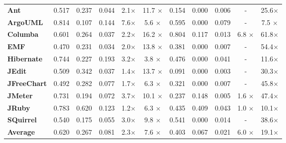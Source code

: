 \begin{table}[!thb]
\begin{center}
\begin{tabular}{l| c c c c c| c c c c c}
        \midrule                                                  
        \textbf{Ant}       &0.517&0.237&0.044&2.1$\times$& 11.7 $\times$&0.154&0.000&0.006&-             & 25.6$\times$  \\
        \textbf{ArgoUML}   &0.814&0.107&0.144&7.6$\times$& 5.6  $\times$&0.595&0.000&0.079&-             & 7.5 $\times$  \\
        \textbf{Columba}   &0.601&0.264&0.037&2.2$\times$& 16.2 $\times$&0.804&0.117&0.013&6.8  $\times$ & 61.8$\times$  \\
        \textbf{EMF}       &0.470&0.231&0.034&2.0$\times$& 13.8 $\times$&0.381&0.000&0.007&-             & 54.4$\times$  \\
        \textbf{Hibernate} &0.744&0.227&0.193&3.2$\times$& 3.8  $\times$&0.476&0.000&0.041&-             & 11.6$\times$  \\
        \textbf{JEdit}     &0.509&0.342&0.037&1.4$\times$& 13.7 $\times$&0.091&0.000&0.003&-             & 30.3$\times$  \\
        \textbf{JFreeChart}&0.492&0.282&0.077&1.7$\times$& 6.3  $\times$&0.321&0.000&0.007&-             & 45.8$\times$  \\
        \textbf{JMeter}    &0.731&0.194&0.072&3.7$\times$& 10.1 $\times$&0.237&0.148&0.005&1.6 $\times$  & 47.4$\times$  \\
        \textbf{JRuby}     &0.783&0.620&0.123&1.2$\times$& 6.3  $\times$&0.435&0.409&0.043&1.0 $\times$  & 10.1$\times$  \\
        \textbf{SQuirrel}  &0.540&0.175&0.055&3.0$\times$& 9.8  $\times$&0.541&0.000&0.014&-             & 38.6$\times$  \\
        \midrule 
        \textbf{Average}   &0.620&0.267&0.081&2.3$\times$&7.6   $\times$&0.403&0.067&0.021&6.0 $\times$  & 19.1$\times$ \\ 
        \bottomrule
        \end{tabular}
    \end{center}    
\end{table}


